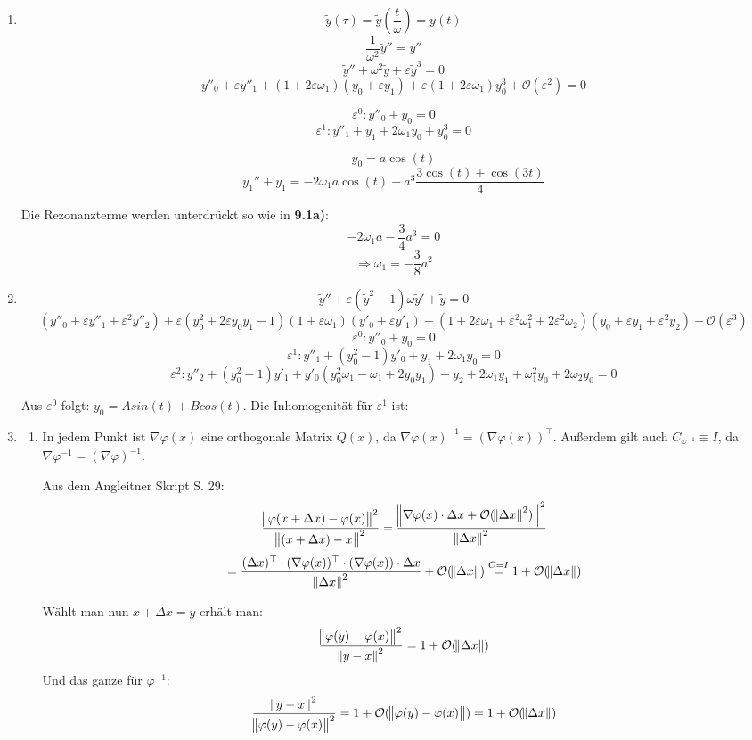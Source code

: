 \documentclass[a4paper,11pt]{scrartcl}
\newcommand*{\eps}{\varepsilon}
\newcommand*{\Ld}{\mathcal{O}}
\newcommand*{\Dx}{\Delta{}x}
\newcommand*{\yt}{\tilde{y}}
\begin{document}
\begin{enumerate}[label*=\textbf{9.\arabic*.}]
\item
  \[\yt(\tau) = \yt\left(\frac{t}{\omega}\right)= y(t)\]
  \[\frac{1}{\omega^2} \yt'' = y''\]
  \[\yt'' + \omega^2 \yt + \eps \yt^3 = 0\]
  \[y''_0 + \eps y''_1 + (1 + 2 \eps \omega_1)(y_0 + \eps y_1) + \eps 
(1 + 2 \eps \omega_1) y^3_0 + \Ld(\eps^2)= 0\]

  \[\eps^0: y''_0 + y_0 = 0\]
  \[\eps^1: y''_1 + y_1 + 2 \omega_1 y_0 + y_0^3 = 0\]

  \[y_0 = a \cos(t)\]
  \[y_1'' + y_1 = -2 \omega_1 a \cos(t) - a^3 \frac{3 \cos(t) + \cos(3t)}{4}\]

  Die Rezonanzterme werden unterdrückt so wie in \textbf{9.1a)}:
  \[-2\omega_1 a - \frac{3}{4} a^3 = 0\]
  \[\Rightarrow \omega_1 = -\frac{3}{8} a^2\]


\item
  \[ \yt'' + \eps(\yt^2 - 1) \omega \yt' + \yt = 0\]
  \[ (y''_0 + \eps y''_1 + \eps^2 y''_2) + \eps (y^2_0 + 2 \eps y_0 y_1 - 1) (1
    + \eps \omega_1) (y'_0 + \eps y'_1) + (1 + 2 \eps \omega_1 + \eps^2 \omega^2_1
    + 2 \eps^2 \omega_2)
    (y_0 + \eps y_1 + \eps^2 y_2) + \Ld(\eps^3)\]
  \[ \eps^0: y''_0 + y_0 = 0\]
  \[ \eps^1: y''_1 + (y^2_0-1) y'_0 + y_1 + 2 \omega_1 y_0 = 0 \]
  \[ \eps^2: y''_2 + (y_0^2-1) y'_1 + y'_0 (y_0^2 \omega_1 - \omega_1 + 2 y_0 y_1)  + y_2 + 2 \omega_1 y_1 + \omega^2_1 y_0 + 2\omega_2 y_0 = 0\]

  Aus $\eps^0$ folgt:
  $y_0 = A sin(t) + B cos(t)$.
  Die Inhomogenität für $\eps^1$ ist:
  

\item \begin{enumerate}
  \item
    In jedem Punkt ist $\nabla \varphi(x)$ eine orthogonale Matrix $Q(x)$,
    da $\nabla\varphi(x)^{-1} = (\nabla \varphi(x))^\top$.
    Außerdem gilt auch $C_{\varphi^{-1}} \equiv I$, da $\nabla \varphi^{-1} =
    (\nabla \varphi)^{-1}$.

    Aus dem Angleitner Skript S. 29:
    \[
      \frac{\norm{\varphi(x+\Dx) - \varphi(x)}^2}{\norm{(x + \Dx) - x}^2}
    = \frac{\norm{\nabla\varphi(x)\cdot \Dx + \Ld(\norm{\Delta
          x}^2)}^2}{\norm{\Dx}^2}\]
    \[= \frac{(\Dx)^\top \cdot
      (\nabla\varphi(x))^\top \cdot (\nabla\varphi(x))\cdot \Dx}{\norm{\Delta
        x}^2} + \Ld(\norm{\Dx}) \overset{C=I}{=} 1 + \Ld(\norm{\Dx}) \]

  Wählt man nun $x + \Dx = y$ erhält man:
\[ \frac{\norm{\varphi(y) - \varphi(x)}^2}{\norm{y - x}^2} = 1 +
  \Ld(\norm{\Dx}) \]
Und das ganze für $\varphi^{-1}$:
\[ \frac{\norm{y - x}^2}{\norm{\varphi(y) - \varphi(x)}^2} = 1 +
  \Ld(\norm{\varphi(y)-\varphi(x)}) = 1 + \Ld(\norm{\Dx})\]


\end{enumerate}
\end{enumerate}
\end{document}
